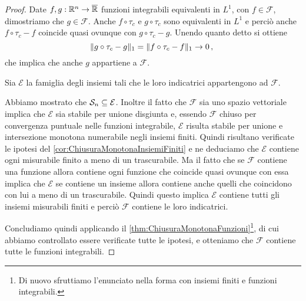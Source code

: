\begin{proof}
	Date $f,g:\R^n\to\Rbar$ funzioni integrabili equivalenti in $L^1$, con $f\in\mathcal F$, dimostriamo che $g\in\mathcal F$. 
	Anche $f\circ\tau_c$ e $g\circ\tau_c$ sono equivalenti in $L^1$ e perciò anche $f\circ\tau_c-f$ coincide quasi ovunque con $g\circ\tau_c-g$.
	Unendo quanto detto si ottiene
	\begin{equation*}
		\LNorm{g\circ\tau_c-g}=\LNorm{f\circ\tau_c-f}\to 0 \virgola
	\end{equation*}
	che implica che anche $g$ appartiene a $\mathcal F$.
	
	Sia $\mathcal E$ la famiglia degli insiemi tali che le loro indicatrici appartengono ad $\mathcal F$. 
	
	Abbiamo mostrato che $\S_n\subseteq \mathcal E$. 
	Inoltre il fatto che $\mathcal F$ sia uno spazio vettoriale implica che $\mathcal E$ sia stabile per unione disgiunta e, essendo $\mathcal F$ chiuso per convergenza puntuale nelle funzioni integrabile, $\mathcal E$ risulta stabile per unione e intersezione monotona numerabile negli insiemi finiti.
	Quindi risultano verificate le ipotesi del \cref{cor:ChiusuraMonotonaInsiemiFiniti} e ne deduciamo che $\mathcal E$ contiene ogni misurabile finito a meno di un trascurabile. Ma il fatto che se $\mathcal F$ contiene una funzione allora contiene ogni funzione che coincide quasi ovunque con essa implica che $\mathcal E$ se contiene un insieme allora contiene anche quelli che coincidono con lui a meno di un trascurabile.
	Quindi questo implica $\mathcal E$ contiene tutti gli insiemi misurabili finiti e perciò $\mathcal F$ contiene le loro indicatrici.
	
	Concludiamo quindi applicando il \cref{thm:ChiusuraMonotonaFunzioni}\footnote{Di nuovo sfruttiamo l'enunciato nella forma con insiemi finiti e funzioni integrabili.}, di cui abbiamo controllato essere verificate tutte le ipotesi, e otteniamo che $\mathcal F$ contiene tutte le funzioni integrabili.
\end{proof}

